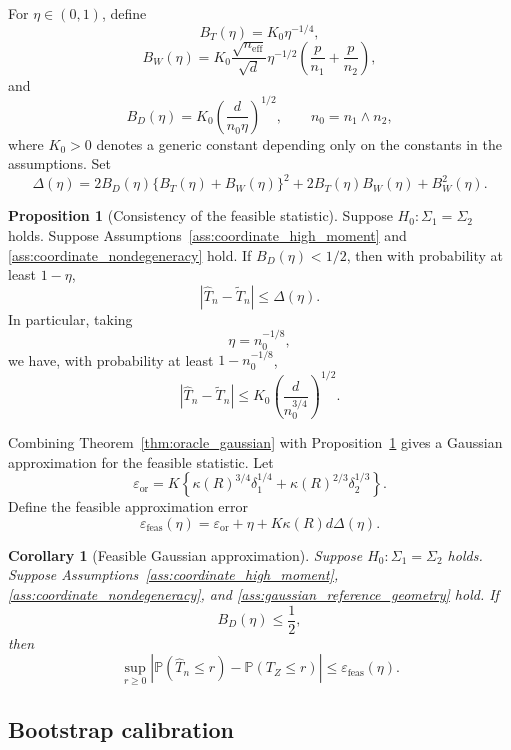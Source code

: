 \documentclass[
  12pt]{article}
\theoremstyle{plain}
\newtheorem{corollary}[theorem]{Corollary}
\theoremstyle{definition}
\newtheorem{proposition}{Proposition}[section]
\theoremstyle{remark}
\begin{document}
For \(\eta\in(0,1)\), define
\[
B_T(\eta)=K_0\eta^{-1/4},
\]
\[
B_W(\eta)
=
K_0
\frac{\sqrt{n_{\mathrm{eff}}}}{\sqrt d}
\eta^{-1/2}
\left(
\frac{p}{n_1}
+
\frac{p}{n_2}
\right),
\]
and
\[
B_D(\eta)
=
K_0
\left(
\frac{d}{n_0\eta}
\right)^{1/2},
\qquad
n_0=n_1\wedge n_2,
\]
where \(K_0>0\) denotes a generic constant depending only on the constants in the
assumptions.  Set
\[
\Delta(\eta)
=
2B_D(\eta)\{B_T(\eta)+B_W(\eta)\}^2
+
2B_T(\eta)B_W(\eta)
+
B_W^2(\eta).
\]

\begin{proposition}[Consistency of the feasible statistic]
\label{prop:sample_oracle_transfer}
Suppose \(H_0:\Sigma_1=\Sigma_2\) holds.  Suppose
Assumptions~\ref{ass:coordinate_high_moment} and
\ref{ass:coordinate_nondegeneracy} hold.  If \(B_D(\eta)<1/2\), then with probability at least
\(1-\eta\),
\[
|\widehat T_n-\widetilde T_n|
\le
\Delta(\eta).
\]
In particular, taking
\[
\eta=n_0^{-1/8},
\]
we have, with probability at least \(1-n_0^{-1/8}\),
\[
|\widehat T_n-\widetilde T_n|
\le
K_0
\left(\frac{d}{n_0^{3/4}}\right)^{1/2}.
\]
\end{proposition}

Combining Theorem~\ref{thm:oracle_gaussian} with
Proposition~\ref{prop:sample_oracle_transfer} gives a Gaussian approximation
for the feasible statistic.  Let
\[
\varepsilon_{\mathrm{or}}
=
K
\left\{
\kappa(R)^{3/4}\delta_1^{1/4}
+
\kappa(R)^{2/3}\delta_2^{1/3}
\right\}.
\]
Define the feasible approximation error
\begin{equation}
\label{eq:feasible-gaussian-error}
\varepsilon_{\mathrm{feas}}(\eta)
=
\varepsilon_{\mathrm{or}}
+
\eta
+
K\kappa(R)d\Delta(\eta).
\end{equation}

\begin{corollary}[Feasible Gaussian approximation]
\label{cor:feasible_gaussian}
Suppose \(H_0:\Sigma_1=\Sigma_2\) holds.  Suppose
Assumptions~\ref{ass:coordinate_high_moment},
\ref{ass:coordinate_nondegeneracy}, and
\ref{ass:gaussian_reference_geometry} hold.  If
\[
B_D(\eta)\le \frac12,
\]
then
\[
\sup_{r\ge0}
\left|
\mathbb P(\widehat T_n\le r)
-
\mathbb P(T_Z\le r)
\right|
\le
\varepsilon_{\mathrm{feas}}(\eta).
\]
\end{corollary}

\subsection{Bootstrap calibration}
\label{subsec:bootstrap_calibration}
\end{document}
